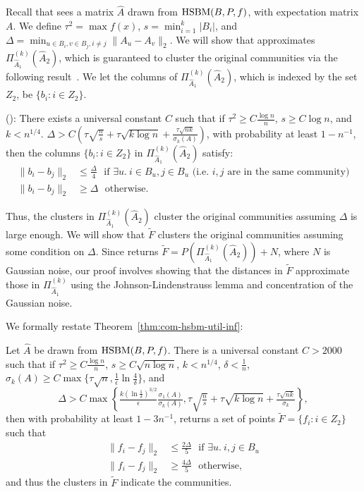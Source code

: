 Recall that \dpcom{} sees a matrix $\hat{A}$ drawn from $\textnormal{HSBM}(B,P,f)$, with expectation matrix $A$. We define $\tau^2 = \max f(x)$, $s = \min_{i=1}^k |B_i|$, and $\Delta=\min_{u \in B_i, v \in B_j, i \neq j} \|A_u - A_v\|_2$. 
We will show that \dpcom{} approximates $\Pi_{\hat{A}_1}^{(k)}(\hat{A}_2)$, which is guaranteed to cluster the original communities via the following result~\citep{vu2014simple}. We let the columns of $\Pi_{\hat{A}_1}^{(k)}(\hat{A}_2)$, which is indexed by the set $Z_2$, be $\{b_i : i \in Z_2\}$.

\begin{thm}\label{thm:svd-recovery} (\citet{vu2014simple}): There exists a universal constant $C$ such that if $\tau^2 \geq C \frac{\log n}{n}$, $s \geq C \log n$, and $k < n^{1/4}$.  $\Delta > C (\tau \sqrt{\frac{n}{s}} + \tau \sqrt{k \log n} + \frac{\tau\sqrt{nk}}{\sigma_k(A)})$, with probability at least $1 - n^{-1}$, then the columns $\{b_i : i \in Z_2\}$ in $\Pi_{\hat{A}_1}^{(k)}(\hat{A}_2)$ satisfy:
\begin{align*}
    \|b_{i} - b_{j}\|_2 &\leq \frac{\Delta}{4}  \ \ \ \text{if $\exists u.~i \in B_u, j \in B_u$ (i.e. $i,j$ are in the same community)} \\ 
    \|b_{i} - b_{j}\|_2 &\geq \Delta  \ \ \ \text{otherwise.}
\end{align*}
\end{thm}

Thus, the clusters in $\Pi_{\hat{A}_1}^{(k)}(\hat{A}_2)$ cluster the original communities assuming $\Delta$ is large enough. We will show that $\tilde{F}$ clusters the original communities assuming some condition on $\Delta$. Since
\dpcom{} returns $\tilde{F} = P(\Pi_{\hat{A}_1}^{(k)}(\hat{A}_2)) + N$, where $N$ is Gaussian noise, our proof involves showing that the distances in $\tilde{F}$ approximate those in $\Pi_{\hat{A}_1}^{(k)}$ using the Johnson-Lindenstrauss lemma and concentration of the Gaussian noise.

We formally restate Theorem~\ref{thm:com-hsbm-util-inf}:

\begin{thm}\label{thm:com-hsbm-util}
Let $\hat{A}$ be drawn from $\textnormal{HSBM}(B,P,f)$. There is a universal constant $C > 2000$ such that if $\tau^2 \geq C \frac{\log n}{n}$, $s \geq C \sqrt{n \log n}$, $k < n^{1/4}$, $\delta < \frac{1}{n}$, $\sigma_k(A) \geq C \max\{ \tau \sqrt{n}, \frac{1}{\epsilon} \ln \frac{4}{\delta}\}$, and 
\[\Delta > C\max\left\{\tfrac{ k (\ln \frac{1}{\delta})^{3/2}}\epsilon \tfrac{\sigma_1(A)}{\sigma_{k}(A)},  \tau \sqrt{\tfrac{n}{s}} + \tau \sqrt{k \log n} + \tfrac{\tau\sqrt{nk}}{\sigma_k}\right\},\]
then with probability at least $1 - 3n^{-1}$, \dpcom{} returns a set of points $\tilde{F} = \{f_i : i \in Z_2\}$ such that
\begin{align*}
    \|f_{i} - f_{j}\|_2 &\leq \frac{2\Delta}{5}  \ \ \ \text{if $\exists u.~i,j \in B_u$} \\
    \|f_{i} - f_{j}\|_2 &\geq \frac{4\Delta}{5}  \ \ \ \text{otherwise},
\end{align*}
and thus the clusters in $\tilde{F}$ indicate the communities.
\end{thm}

